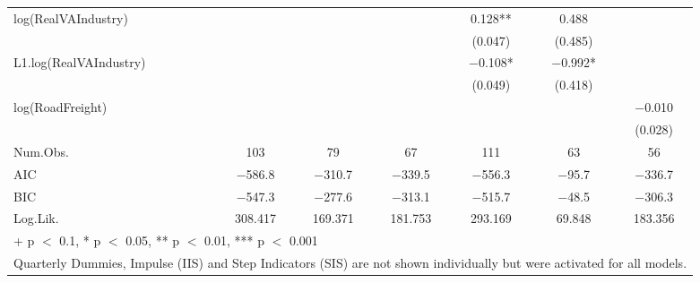 \begin{table}
{\begin{tabular}[t]{lcccccc}
log(RealVAIndustry) &  &  &  & \num{0.128}** & \num{0.488} & \\
 &  &  &  & (\num{0.047}) & (\num{0.485}) & \\
L1.log(RealVAIndustry) &  &  &  & \num{-0.108}* & \num{-0.992}* & \\
 &  &  &  & (\num{0.049}) & (\num{0.418}) & \\
log(RoadFreight) &  &  &  &  &  & \num{-0.010}\\
 &  &  &  &  &  & (\num{0.028})\\
\midrule
Num.Obs. & \num{103} & \num{79} & \num{67} & \num{111} & \num{63} & \num{56}\\
AIC & \num{-586.8} & \num{-310.7} & \num{-339.5} & \num{-556.3} & \num{-95.7} & \num{-336.7}\\
BIC & \num{-547.3} & \num{-277.6} & \num{-313.1} & \num{-515.7} & \num{-48.5} & \num{-306.3}\\
Log.Lik. & \num{308.417} & \num{169.371} & \num{181.753} & \num{293.169} & \num{69.848} & \num{183.356}\\
\bottomrule
\multicolumn{7}{l}{\rule{0pt}{1em}+ p $<$ 0.1, * p $<$ 0.05, ** p $<$ 0.01, *** p $<$ 0.001}\\
\multicolumn{7}{l}{\rule{0pt}{1em}Quarterly Dummies, Impulse (IIS) and Step Indicators (SIS) are not shown individually but were activated for all models.}\\
\end{tabular}}
\end{table}
